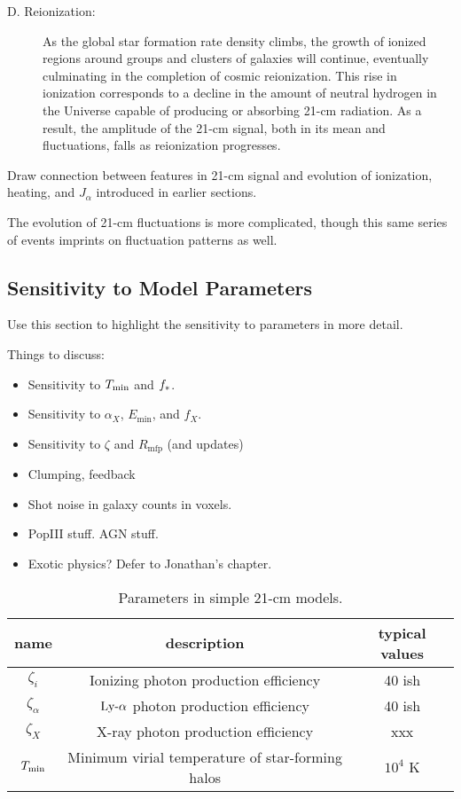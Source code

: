 \begin{description}
	\item[D. Reionization:] As the global star formation rate density climbs, the growth of ionized regions around groups and clusters of galaxies will continue, eventually culminating in the completion of cosmic reionization. This rise in ionization corresponds to a decline in the amount of neutral hydrogen in the Universe capable of producing or absorbing 21-cm radiation. As a result, the amplitude of the 21-cm signal, both in its mean and fluctuations, falls as reionization progresses.
\end{description}

{\color{red} Draw connection between features in 21-cm signal and evolution of ionization, heating, and $J_{\alpha}$ introduced in earlier sections.}


The evolution of 21-cm fluctuations is more complicated, though this same series of events imprints on fluctuation patterns as well. 


\subsection{Sensitivity to Model Parameters}
Use this section to highlight the sensitivity to parameters in more detail.

Things to discuss:
\begin{itemize}
	\item Sensitivity to $T_{\min}$ and $f_{\ast}$.
	\item Sensitivity to $\alpha_X$, $E_{\min}$, and $f_X$.
	\item Sensitivity to $\zeta$ and $R_{\mathrm{mfp}}$ (and updates)
	\item Clumping, feedback
	\item Shot noise in galaxy counts in voxels.
	\item PopIII stuff. AGN stuff.
	\item Exotic physics? Defer to Jonathan's chapter.
\end{itemize}


\begin{center}
\begin{table}
\begin{tabular}{||c | c | c||}
\hline
name & description & typical values \\ 
\hline\hline
$\zeta_i$ & Ionizing photon production efficiency & 40 ish  \\ 
\hline
$\zeta_{\alpha}$ & $\text{Ly-}\alpha$ photon production efficiency & 40 ish  \\ 
\hline
$\zeta_X$ & X-ray photon production efficiency & xxx \\
\hline
$T_{\min}$ & Minimum virial temperature of star-forming halos & $10^4$ K \\
\hline
\end{tabular}
\caption{Parameters in simple 21-cm models.}
\end{table}
\end{center}


